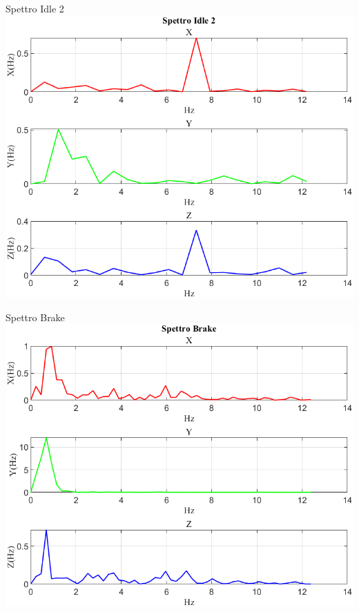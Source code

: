 \documentclass[beamer]{standalone}
\begin{document}
	\begin{frame}{{Spettro Idle 2}}
		\centering\includegraphics[height=.8\textheight]{figure/Mag/Trasformata/Spettro Idle 2}
	\end{frame}
	
	\begin{frame}{{Spettro Brake}}
		\centering\includegraphics[height=.8\textheight]{figure/Mag/Trasformata/Spettro Brake}
	\end{frame}
	
\end{document}
